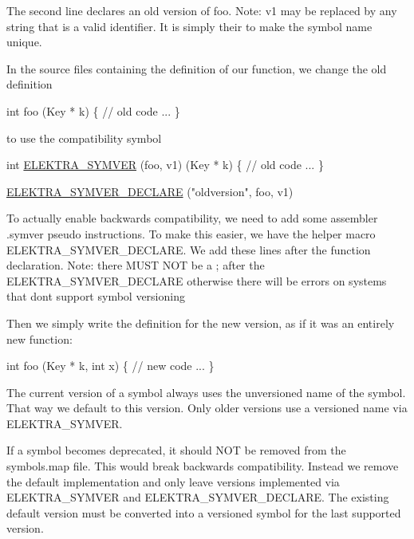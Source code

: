 The second line declares an old version of {\ttfamily foo}. Note\+: {\ttfamily v1} may be replaced by any string that is a valid identifier. It is simply their to make the symbol name unique.

In the source files containing the definition of our function, we change the old definition


\begin{DoxyCode}
\textcolor{keywordtype}{int} foo (Key * k)
\{
    \textcolor{comment}{// old code ...}
\}
\end{DoxyCode}


to use the compatibility symbol


\begin{DoxyCode}
\textcolor{keywordtype}{int} \hyperlink{kdbmacros_8h_a5dd9e2d021e60949f63eeb88b8b2558c}{ELEKTRA\_SYMVER} (foo, v1) (Key * k)
\{
    \textcolor{comment}{// old code ...}
\}

\hyperlink{kdbmacros_8h_a03ba43b14fd54b22eed39a4130956a5d}{ELEKTRA\_SYMVER\_DECLARE} (\textcolor{stringliteral}{"oldversion"}, foo, v1)
\end{DoxyCode}


To actually enable backwards compatibility, we need to add some assembler {\ttfamily .symver} pseudo instructions. To make this easier, we have the helper macro {\ttfamily E\+L\+E\+K\+T\+R\+A\+\_\+\+S\+Y\+M\+V\+E\+R\+\_\+\+D\+E\+C\+L\+A\+RE}. We add these lines after the function declaration. Note\+: there M\+U\+ST N\+OT be a {\ttfamily ;} after the {\ttfamily E\+L\+E\+K\+T\+R\+A\+\_\+\+S\+Y\+M\+V\+E\+R\+\_\+\+D\+E\+C\+L\+A\+RE} otherwise there will be errors on systems that don\textquotesingle{}t support symbol versioning

Then we simply write the definition for the new version, as if it was an entirely new function\+:


\begin{DoxyCode}
\textcolor{keywordtype}{int} foo (Key * k, \textcolor{keywordtype}{int} x)
\{
    \textcolor{comment}{// new code ...}
\}
\end{DoxyCode}


The current version of a symbol always uses the unversioned name of the symbol. That way we default to this version. Only older versions use a versioned name via {\ttfamily E\+L\+E\+K\+T\+R\+A\+\_\+\+S\+Y\+M\+V\+ER}.

If a symbol becomes deprecated, it should N\+OT be removed from the {\ttfamily symbols.\+map} file. This would break backwards compatibility. Instead we remove the default implementation and only leave versions implemented via {\ttfamily E\+L\+E\+K\+T\+R\+A\+\_\+\+S\+Y\+M\+V\+ER} and {\ttfamily E\+L\+E\+K\+T\+R\+A\+\_\+\+S\+Y\+M\+V\+E\+R\+\_\+\+D\+E\+C\+L\+A\+RE}. The existing default version must be converted into a versioned symbol for the last supported version. 
